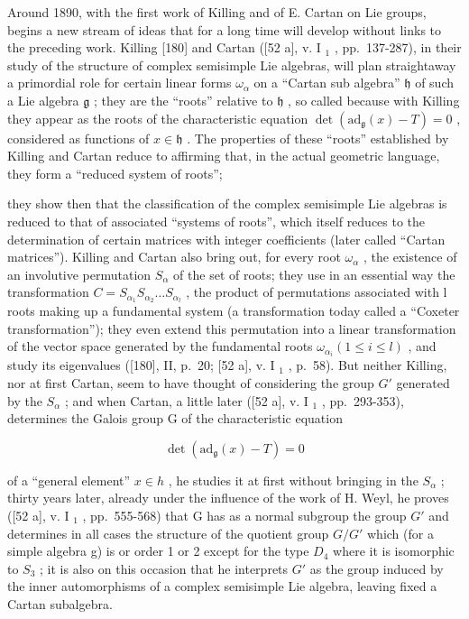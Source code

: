 Around 1890, with the first work of Killing and of E. Cartan on Lie groups, begins a new stream of ideas that for a long time will develop without links to the preceding work. Killing {[}180{]} and Cartan ({[}52 a{]}, v. I \(_{1}\) , pp.~137-287), in their study of the structure of complex semisimple Lie algebras, will plan straightaway a primordial role for certain linear forms \(\omega_{\alpha}\) on a ``Cartan sub algebra'' \(\mathfrak{h}\) of such a Lie algebra \(\mathfrak{g}\) ; they are the ``roots'' relative to \(\mathfrak{h}\) , so called because with Killing they appear as the roots of the characteristic equation \(\det(\mathrm{ad}_{\mathfrak{g}}(x) - T) = 0\) , considered as functions of \(x \in \mathfrak{h}\) . The properties of these ``roots'' established by Killing and Cartan reduce to affirming that, in the actual geometric language, they form a ``reduced system of roots'';

they show then that the classification of the complex semisimple Lie algebras is reduced to that of associated ``systems of roots'', which itself reduces to the determination of certain matrices with integer coefficients (later called ``Cartan matrices''). Killing and Cartan also bring out, for every root \(\omega_{\alpha}\) , the existence of an involutive permutation \(S_{\alpha}\) of the set of roots; they use in an essential way the transformation \(C = S_{\alpha_{1}}S_{\alpha_{2}} \ldots S_{\alpha_{l}}\) , the product of permutations associated with l roots making up a fundamental system (a transformation today called a ``Coxeter transformation''); they even extend this permutation into a linear transformation of the vector space generated by the fundamental roots \(\omega_{\alpha_{i}}(1 \leq i \leq l)\) , and study its eigenvalues ({[}180{]}, II, p.~20; {[}52 a{]}, v. I \(_{1}\) , p.~58). But neither Killing, nor at first Cartan, seem to have thought of considering the group \(G'\) generated by the \(S_{\alpha}\) ; and when Cartan, a little later ({[}52 a{]}, v. I \(_{1}\) , pp.~293-353), determines the Galois group G of the characteristic equation

\[
\det (\mathrm{ad} _ {\mathfrak {g}} (x) - T) = 0
\]

of a ``general element'' \(x \in h\) , he studies it at first without bringing in the \(S_{\alpha}\) ; thirty years later, already under the influence of the work of H. Weyl, he proves ({[}52 a{]}, v. I \(_{1}\) , pp.~555-568) that G has as a normal subgroup the group \(G'\) and determines in all cases the structure of the quotient group \(G/G'\) which (for a simple algebra g) is or order 1 or 2 except for the type \(D_{4}\) where it is isomorphic to \(S_{3}\) ; it is also on this occasion that he interprets \(G'\) as the group induced by the inner automorphisms of a complex semisimple Lie algebra, leaving fixed a Cartan subalgebra.

